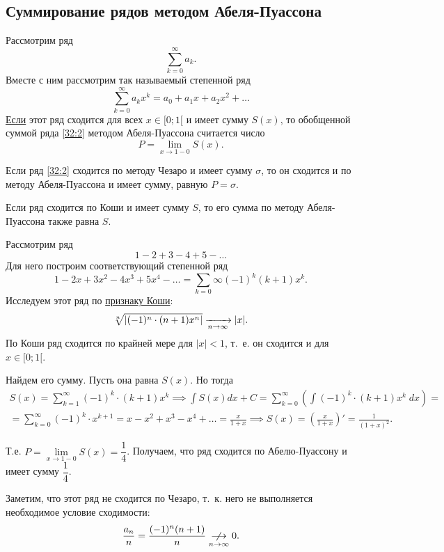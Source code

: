 \documentclass[../../main.tex]{subfiles}
\begin{document}
\subsection{Суммирование рядов методом Абеля-Пуассона}

Рассмотрим ряд
\begin{equation}
 \label{32:2}
 \sum\limits_{k=0}^\infty a_k.
\end{equation}
Вместе с ним рассмотрим так называемый степенной ряд
\[\sum\limits_{k=0}^\infty a_kx^k = a_0 + a_1x + a_2x^2 + \dots\]
\underline{Если} этот ряд сходится для всех $x \in [0;1[$ и имеет сумму $S(x)$, то обобщенной суммой ряда \eqref{32:2} методом Абеля-Пуассона считается число \[P = \lim_{x\to1-0}S(x).\]

\begin{thm}
 Если ряд \eqref{32:2} сходится по методу Чезаро и имеет сумму $\sigma$, то он сходится и по методу Абеля-Пуассона и имеет сумму, равную $P = \sigma$.
\end{thm}

\begin{crl*}
 Если ряд сходится по Коши и имеет сумму $S$, то его сумма по методу Абеля-Пуассона также равна $S$.
\end{crl*}

\begin{exmp}
Рассмотрим ряд \[1-2+3-4+5-\dots\] Для него построим соответствующий степенной ряд \[1-2x+3x^2-4x^3 + 5x^4 - \dots = \sum_{k=0}\infty (-1)^k(k+1)x^k.\]
Исследуем этот ряд по \hyperref[lec27:cauchy]{признаку Коши}:
\[\sqrt[n]{\left|{(-1)^n\cdot(n+1)x^n}\right|} \xrightarrow[n\to\infty]{} |x|.\]
По Коши ряд сходится по крайней мере для $|x| < 1$, т.~е. он сходится и для $x \in [0;1[$.

Найдем его сумму. Пусть она равна $S(x)$. Но тогда
\begin{gather*}
 S(x) = \sum\limits_{k=1}^\infty (-1)^k\cdot(k+1)x^k \implies \int S(x)dx + C = \sum\limits_{k=0}^\infty \left(\int (-1)^k\cdot(k+1)x^k\;dx\right) = \\ =
 \sum\limits_{k=0}^\infty (-1)^k\cdot x^{k+1} =
 x - x^2 + x^3 - x^4 + \dots = \frac x{1+x} \implies S(x) = \left(\frac x{1+x}\right)' = \frac 1{(1+x)^2}.
\end{gather*}

Т.е. $P = \lim\limits_{x\to1-0} S(x) = \dfrac14$. Получаем, что ряд сходится по Абелю-Пуассону и имеет сумму $\dfrac14$.

Заметим, что этот ряд не сходится по Чезаро, т.~к. него не выполняется необходимое условие сходимости: \[\frac{a_n}n = \frac{(-1)^n(n+1)}n \underset{n\to\infty}{\centernot\longrightarrow} 0.\]
\end{exmp}
\end{document}
